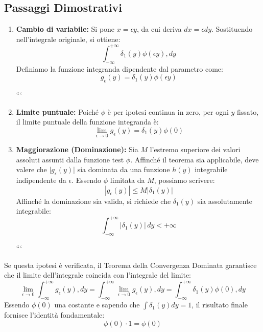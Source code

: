 \subsection{Passaggi Dimostrativi}
\begin{enumerate}
\item \textbf{Cambio di variabile:} Si pone $x = \epsilon y$, da cui deriva $dx = \epsilon dy$. Sostituendo nell'integrale originale, si ottiene:
\begin{equation}
\int_{-\infty}^{+\infty} \delta_1(y) \phi(\epsilon y) , dy
\end{equation}
Definiamo la funzione integranda dipendente dal parametro come:
\begin{equation}
g_\epsilon(y) = \delta_1(y) \phi(\epsilon y)
\end{equation}

```
\item \textbf{Limite puntuale:} Poiché $\phi$ è per ipotesi continua in zero, per ogni $y$ fissato, il limite puntuale della funzione integranda è:
\begin{equation}
    \lim_{\epsilon \to 0} g_\epsilon(y) = \delta_1(y) \phi(0)
\end{equation}

\item \textbf{Maggiorazione (Dominazione):} Sia $M$ l'estremo superiore dei valori assoluti assunti dalla funzione test $\phi$. Affinché il teorema sia applicabile, deve valere che $\vert{}g_\epsilon(y)\vert{}$ sia dominata da una funzione $h(y)$ integrabile indipendente da $\epsilon$. Essendo $\phi$ limitata da $M$, possiamo scrivere:
\begin{equation}
    |g_\epsilon(y)| \leq M |\delta_1(y)|
\end{equation}
Affinché la dominazione sia valida, si richiede che $\delta_1(y)$ sia assolutamente integrabile:
\begin{equation}
    \int_{-\infty}^{+\infty} |\delta_1(y)| \, dy < +\infty
\end{equation}

```

\end{enumerate}

Se questa ipotesi è verificata, il Teorema della Convergenza Dominata garantisce che il limite dell'integrale coincida con l'integrale del limite:
\begin{equation}
\lim_{\epsilon \to 0} \int_{-\infty}^{+\infty} g_\epsilon(y) , dy = \int_{-\infty}^{+\infty} \lim_{\epsilon \to 0} g_\epsilon(y) , dy = \int_{-\infty}^{+\infty} \delta_1(y) \phi(0) , dy
\end{equation}
Essendo $\phi(0)$ una costante e sapendo che $\int \delta_1(y)dy = 1$, il risultato finale fornisce l'identità fondamentale:
\begin{equation}
\phi(0) \cdot 1 = \phi(0)
\end{equation}

